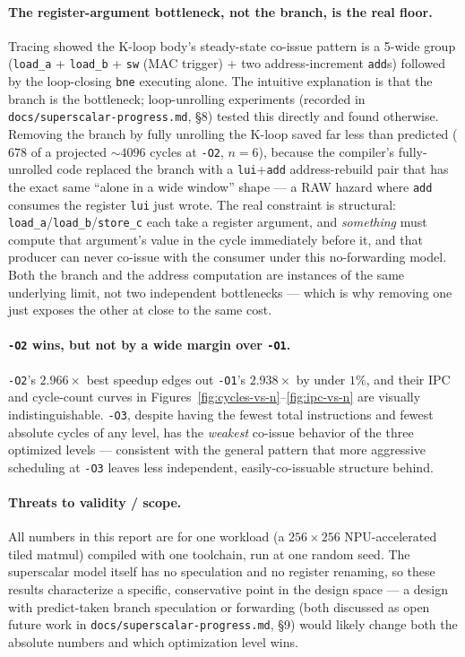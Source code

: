 \documentclass[11pt]{article}
\begin{document}
\paragraph{The register-argument bottleneck, not the branch, is the real
floor.} Tracing showed the K-loop body's steady-state co-issue pattern is a
5-wide group (\texttt{load\_a} + \texttt{load\_b} + \texttt{sw} (MAC
trigger) + two address-increment \texttt{add}s) followed by the loop-closing
\texttt{bne} executing alone. The intuitive explanation is that the branch
is the bottleneck; loop-unrolling experiments (recorded in
\texttt{docs/superscalar-progress.md}, \S8) tested this directly and found
otherwise. Removing the branch by fully unrolling the K-loop saved far less
than predicted ($678$ of a projected $\sim\!4096$ cycles at \texttt{-O2},
$n{=}6$), because the compiler's fully-unrolled code replaced the branch
with a \texttt{lui}+\texttt{add} address-rebuild pair that has the exact
same ``alone in a wide window'' shape --- a RAW hazard where \texttt{add}
consumes the register \texttt{lui} just wrote. The real constraint is
structural: \texttt{load\_a}/\texttt{load\_b}/\texttt{store\_c} each take a
register argument, and \emph{something} must compute that argument's value
in the cycle immediately before it, and that producer can never co-issue
with the consumer under this no-forwarding model. Both the branch and the
address computation are instances of the same underlying limit, not two
independent bottlenecks --- which is why removing one just exposes the
other at close to the same cost.

\paragraph{\texttt{-O2} wins, but not by a wide margin over \texttt{-O1}.}
\texttt{-O2}'s $2.966\times$ best speedup edges out \texttt{-O1}'s
$2.938\times$ by under $1\%$, and their IPC and cycle-count curves in
Figures~\ref{fig:cycles-vs-n}--\ref{fig:ipc-vs-n} are visually
indistinguishable. \texttt{-O3}, despite having the fewest total
instructions and fewest absolute cycles of any level, has the
\emph{weakest} co-issue behavior of the three optimized levels ---
consistent with the general pattern that more aggressive scheduling at
\texttt{-O3} leaves less independent, easily-co-issuable structure behind.

\paragraph{Threats to validity / scope.} All numbers in this report are for
one workload (a $256\times256$ NPU-accelerated tiled matmul) compiled with
one toolchain, run at one random seed. The superscalar model itself has no
speculation and no register renaming, so these results characterize a
specific, conservative point in the design space --- a design with
predict-taken branch speculation or forwarding (both discussed as open
future work in \texttt{docs/superscalar-progress.md}, \S9) would likely
change both the absolute numbers and which optimization level wins.
\end{document}
